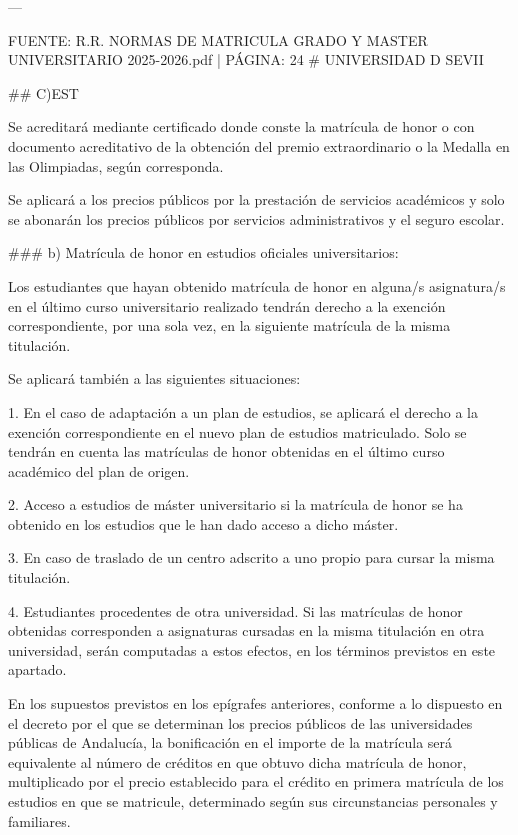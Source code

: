 \documentclass{article}
\begin{document}
\begin{itemize}
\begin{itemize}
\begin{scriptsize}
                  ---

                  FUENTE: R.R. NORMAS DE MATRICULA GRADO Y MASTER UNIVERSITARIO 2025-2026.pdf | PÁGINA: 24
                  \# UNIVERSIDAD D SEVII

                  \#\# C)EST

                  Se acreditará mediante certificado donde conste la matrícula de honor o con documento acreditativo de la obtención del premio extraordinario o la Medalla en las Olimpiadas, según corresponda.

                  Se aplicará a los precios públicos por la prestación de servicios académicos y solo se abonarán los precios públicos por servicios administrativos y el seguro escolar.

                  \#\#\# b) Matrícula de honor en estudios oficiales universitarios:

                  Los estudiantes que hayan obtenido matrícula de honor en alguna/s asignatura/s en el último curso universitario realizado tendrán derecho a la exención correspondiente, por una sola vez, en la siguiente matrícula de la misma titulación.

                  Se aplicará también a las siguientes situaciones:

                  1. En el caso de adaptación a un plan de estudios, se aplicará el derecho a la exención correspondiente en el nuevo plan de estudios matriculado. Solo se tendrán en cuenta las matrículas de honor obtenidas en el último curso académico del plan de origen.

                  2. Acceso a estudios de máster universitario si la matrícula de honor se ha obtenido en los estudios que le han dado acceso a dicho máster.

                  3. En caso de traslado de un centro adscrito a uno propio para cursar la misma titulación.

                  4. Estudiantes procedentes de otra universidad. Si las matrículas de honor obtenidas corresponden a asignaturas cursadas en la misma titulación en otra universidad, serán computadas a estos efectos, en los términos previstos en este apartado.

                  En los supuestos previstos en los epígrafes anteriores, conforme a lo dispuesto en el decreto por el que se determinan los precios públicos de las universidades públicas de Andalucía, la bonificación en el importe de la matrícula será equivalente al número de créditos en que obtuvo dicha matrícula de honor, multiplicado por el precio establecido para el crédito en primera matrícula de los estudios en que se matricule, determinado según sus circunstancias personales y familiares.


\end{scriptsize}
\end{itemize}
\end{itemize}
\end{document}
